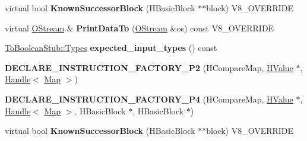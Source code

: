 \begin{DoxyCompactItemize}
\item 
\hypertarget{classv8_1_1internal_1_1_v8___f_i_n_a_l_a85ba341b22db01ee3cd7145d9f8e9b99}{}virtual bool {\bfseries Known\+Successor\+Block} (H\+Basic\+Block $\ast$$\ast$block) V8\+\_\+\+O\+V\+E\+R\+R\+I\+D\+E\label{classv8_1_1internal_1_1_v8___f_i_n_a_l_a85ba341b22db01ee3cd7145d9f8e9b99}

\item 
\hypertarget{classv8_1_1internal_1_1_v8___f_i_n_a_l_ac450dad970b14246be761ccf5004924b}{}virtual \hyperlink{classv8_1_1internal_1_1_o_stream}{O\+Stream} \& {\bfseries Print\+Data\+To} (\hyperlink{classv8_1_1internal_1_1_o_stream}{O\+Stream} \&os) const V8\+\_\+\+O\+V\+E\+R\+R\+I\+D\+E\label{classv8_1_1internal_1_1_v8___f_i_n_a_l_ac450dad970b14246be761ccf5004924b}

\item 
\hypertarget{classv8_1_1internal_1_1_v8___f_i_n_a_l_a60e4cf1bf8de2d4780009429752fd481}{}\hyperlink{classv8_1_1internal_1_1_to_boolean_stub_1_1_types}{To\+Boolean\+Stub\+::\+Types} {\bfseries expected\+\_\+input\+\_\+types} () const \label{classv8_1_1internal_1_1_v8___f_i_n_a_l_a60e4cf1bf8de2d4780009429752fd481}

\item 
\hypertarget{classv8_1_1internal_1_1_v8___f_i_n_a_l_aab6626b6b2e748c8ab6bf6f947e2039a}{}{\bfseries D\+E\+C\+L\+A\+R\+E\+\_\+\+I\+N\+S\+T\+R\+U\+C\+T\+I\+O\+N\+\_\+\+F\+A\+C\+T\+O\+R\+Y\+\_\+\+P2} (H\+Compare\+Map, \hyperlink{classv8_1_1internal_1_1_h_value}{H\+Value} $\ast$, \hyperlink{classv8_1_1internal_1_1_handle}{Handle}$<$ \hyperlink{classv8_1_1internal_1_1_map}{Map} $>$)\label{classv8_1_1internal_1_1_v8___f_i_n_a_l_aab6626b6b2e748c8ab6bf6f947e2039a}

\item 
\hypertarget{classv8_1_1internal_1_1_v8___f_i_n_a_l_a4c5f05edb277f96cb66bea7ced57328d}{}{\bfseries D\+E\+C\+L\+A\+R\+E\+\_\+\+I\+N\+S\+T\+R\+U\+C\+T\+I\+O\+N\+\_\+\+F\+A\+C\+T\+O\+R\+Y\+\_\+\+P4} (H\+Compare\+Map, \hyperlink{classv8_1_1internal_1_1_h_value}{H\+Value} $\ast$, \hyperlink{classv8_1_1internal_1_1_handle}{Handle}$<$ \hyperlink{classv8_1_1internal_1_1_map}{Map} $>$, H\+Basic\+Block $\ast$, H\+Basic\+Block $\ast$)\label{classv8_1_1internal_1_1_v8___f_i_n_a_l_a4c5f05edb277f96cb66bea7ced57328d}

\item 
\hypertarget{classv8_1_1internal_1_1_v8___f_i_n_a_l_a85ba341b22db01ee3cd7145d9f8e9b99}{}virtual bool {\bfseries Known\+Successor\+Block} (H\+Basic\+Block $\ast$$\ast$block) V8\+\_\+\+O\+V\+E\+R\+R\+I\+D\+E\label{classv8_1_1internal_1_1_v8___f_i_n_a_l_a85ba341b22db01ee3cd7145d9f8e9b99}


\end{DoxyCompactItemize}
